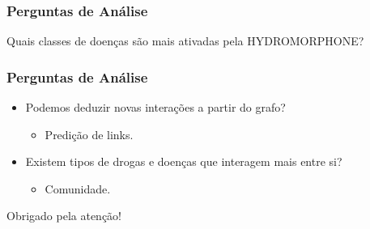 \documentclass[12pt]{beamer}
\begin{document}
\begin{frame}
  \frametitle{Perguntas de Análise}

Quais classes de doenças são mais ativadas pela HYDROMORPHONE?



\end{frame}

\begin{frame}
  \frametitle{Perguntas de Análise}

  \begin{itemize}
    \item Podemos deduzir novas interações a partir do grafo?
    \begin{itemize}
      \item Predição de links.
    \end{itemize}

    \item Existem tipos de drogas e doenças que interagem mais entre si?
    \begin{itemize}
      \item Comunidade.
    \end{itemize}
  \end{itemize}

\end{frame}

\begin{frame}
  \centering Obrigado pela atenção!
\end{frame}
\end{document}
